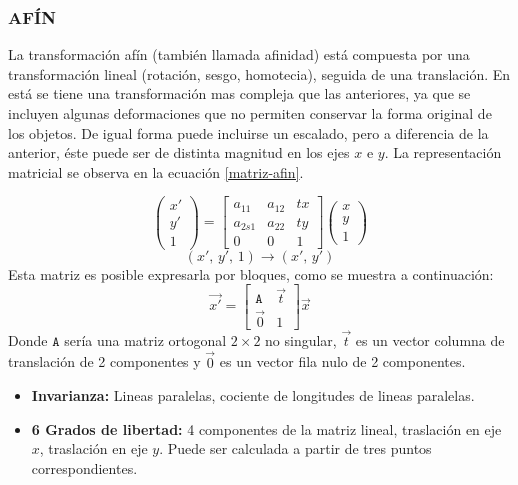 \subsubsection*{AFÍN}

La transformación afín (también llamada afinidad) está compuesta por una transformación lineal (rotación, sesgo, homotecia), seguida de una translación. En está se tiene una transformación mas compleja que las anteriores, ya que se incluyen algunas deformaciones que no permiten conservar la forma original de los objetos. De igual forma puede incluirse un escalado, pero a diferencia de la anterior, éste puede ser de distinta magnitud en los ejes $x$ e $y$. La representación matricial se observa en la ecuación \ref{matriz-afin}.

\begin{equation}
\begin{pmatrix}
{x'}\\{y'}\\{1}
\end{pmatrix} = 
\begin{bmatrix}
{a_{11}}&{a_{12}}&{tx}\\
{a_{2s1}}&{a_{22}}&{ty}\\
{0}&{0}&{1}
\end{bmatrix}
\begin{pmatrix}
{x}\\{y}\\{1}
\end{pmatrix}
\label{matriz-afin}
\end{equation}
\begin{displaymath}
(x', \,y', \,1) \to (x',\, y')
\end{displaymath}
Esta matriz es posible expresarla por bloques, como se muestra a continuación:
\begin{displaymath}
\vec{x'}= 
\begin{bmatrix}
{\mathtt{A}}&{\vec{t}}\\
{\vec{0}}&{1}
\end{bmatrix}
\vec{x}
\label{bloque-afin}
\end{displaymath}
Donde $ \mathtt{A} $ sería una matriz ortogonal $2\times2$ no singular, $\vec{t} $ es un vector columna de translación de 2 componentes y $\vec{0} $ es un vector fila nulo de 2 componentes.

\begin{itemize}
	\item \textbf{Invarianza:} Lineas paralelas, cociente de longitudes de lineas paralelas.
	\item \textbf{6 Grados de libertad:} 4 componentes de la matriz lineal, traslación en eje $x$, traslación en eje $y$. Puede ser calculada a partir de tres puntos correspondientes.
\end{itemize}

